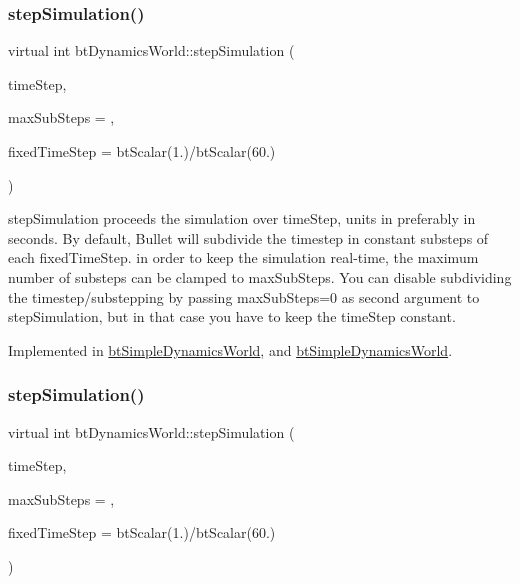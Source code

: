 \subsubsection{\texorpdfstring{step\+Simulation()}{stepSimulation()}\hspace{0.1cm}{\footnotesize\ttfamily [1/2]}}
{\footnotesize\ttfamily virtual int bt\+Dynamics\+World\+::step\+Simulation (\begin{DoxyParamCaption}\item[{bt\+Scalar}]{time\+Step,  }\item[{int}]{max\+Sub\+Steps = {},  }\item[{bt\+Scalar}]{fixed\+Time\+Step = {\ttfamily btScalar(1.)/btScalar(60.)} }\end{DoxyParamCaption})\hspace{0.3cm}{\ttfamily [pure virtual]}}

step\+Simulation proceeds the simulation over \textquotesingle{}time\+Step\textquotesingle{}, units in preferably in seconds. By default, Bullet will subdivide the timestep in constant substeps of each \textquotesingle{}fixed\+Time\+Step\textquotesingle{}. in order to keep the simulation real-\/time, the maximum number of substeps can be clamped to \textquotesingle{}max\+Sub\+Steps\textquotesingle{}. You can disable subdividing the timestep/substepping by passing max\+Sub\+Steps=0 as second argument to step\+Simulation, but in that case you have to keep the time\+Step constant. 

Implemented in \hyperlink{classbtSimpleDynamicsWorld_af6b4810b5018cbaf09f82839111a243d}{bt\+Simple\+Dynamics\+World}, and \hyperlink{classbtSimpleDynamicsWorld_a43bce5ebc50b034e7c2860a01bba5872}{bt\+Simple\+Dynamics\+World}.

\mbox{\label{classbtDynamicsWorld_a5ab26a0d6e8b2b21fbde2ed8f8dd6294}} 
\subsubsection{\texorpdfstring{step\+Simulation()}{stepSimulation()}\hspace{0.1cm}{\footnotesize\ttfamily [2/2]}}
{\footnotesize\ttfamily virtual int bt\+Dynamics\+World\+::step\+Simulation (\begin{DoxyParamCaption}\item[{bt\+Scalar}]{time\+Step,  }\item[{int}]{max\+Sub\+Steps = {},  }\item[{bt\+Scalar}]{fixed\+Time\+Step = {\ttfamily btScalar(1.)/btScalar(60.)} }\end{DoxyParamCaption})\hspace{0.3cm}{\ttfamily [pure virtual]}}

